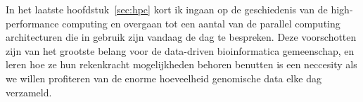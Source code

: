 In het laatste hoofdstuk~\ref{sec:hpc} kort ik ingaan op de geschiedenis van de high-performance computing en overgaan tot een aantal van de parallel computing architecturen die in gebruik zijn vandaag de dag te bespreken.
Deze voorschotten zijn van het grootste belang voor de data-driven bioinformatica gemeenschap, en leren hoe ze hun rekenkracht mogelijkheden behoren benutten is een neccesity als we willen profiteren van de enorme hoeveelheid genomische data elke dag verzameld.
